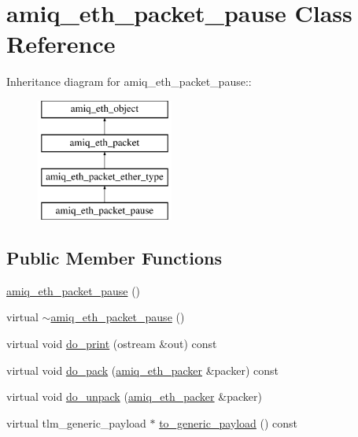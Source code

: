 \hypertarget{classamiq__eth__packet__pause}{
\section{amiq\_\-eth\_\-packet\_\-pause Class Reference}
\label{classamiq__eth__packet__pause}
}
Inheritance diagram for amiq\_\-eth\_\-packet\_\-pause::\begin{figure}[H]
\begin{center}
\leavevmode
\includegraphics[height=4cm]{classamiq__eth__packet__pause}
\end{center}
\end{figure}
\subsection*{Public Member Functions}
\begin{DoxyCompactItemize}
\item 
\hyperlink{classamiq__eth__packet__pause_ade911eec6984347c30f8b537b585c095}{amiq\_\-eth\_\-packet\_\-pause} ()
\item 
virtual \hyperlink{classamiq__eth__packet__pause_abe069c9121e346b2fbbc5aa693ab6a8d}{$\sim$amiq\_\-eth\_\-packet\_\-pause} ()
\item 
virtual void \hyperlink{classamiq__eth__packet__pause_a7ea960bd9c079375b0d4cd72a762d695}{do\_\-print} (ostream \&out) const 
\item 
virtual void \hyperlink{classamiq__eth__packet__pause_aaea61c8cafc5274eac5d2b5428876868}{do\_\-pack} (\hyperlink{classamiq__eth__packer}{amiq\_\-eth\_\-packer} \&packer) const 
\item 
virtual void \hyperlink{classamiq__eth__packet__pause_aa458964a73aa61bca99cb30ffa56f54c}{do\_\-unpack} (\hyperlink{classamiq__eth__packer}{amiq\_\-eth\_\-packer} \&packer)
\item 
virtual tlm\_\-generic\_\-payload $\ast$ \hyperlink{classamiq__eth__packet__pause_ab59bd7087700e15e79018f72d809d76a}{to\_\-generic\_\-payload} () const 
\end{DoxyCompactItemize}
